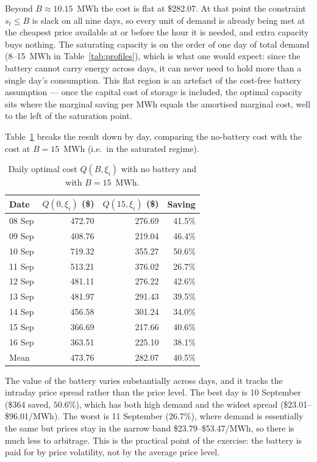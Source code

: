 Beyond $B \approx 10.15$~MWh the cost is flat at \$282.07. At that point the
constraint $s_t \le B$ is slack on all nine days, so every unit of demand is
already being met at the cheapest price available at or before the hour it is
needed, and extra capacity buys nothing. The saturating capacity is on the order of
one day of total demand (8--15~MWh in Table~\ref{tab:profiles}), which is what one
would expect: since the battery cannot carry energy across days, it can never need
to hold more than a single day's consumption. This flat region is an artefact of
the cost-free battery assumption --- once the capital cost of storage is included,
the optimal capacity sits where the marginal saving per MWh equals the amortised
marginal cost, well to the left of the saturation point.

Table~\ref{tab:days} breaks the result down by day, comparing the no-battery cost
with the cost at $B=15$~MWh (i.e.\ in the saturated regime).

\begin{table}[h]
  \centering
  \caption{Daily optimal cost $Q(B,\xi_i)$ with no battery and with $B=15$~MWh.}
  \label{tab:days}
  \begin{tabular}{l|rrr}
    \hline
    Date & $Q(0,\xi_i)$ (\$) & $Q(15,\xi_i)$ (\$) & Saving \\
    \hline
    08 Sep & 472.70 & 276.69 & 41.5\% \\
    09 Sep & 408.76 & 219.04 & 46.4\% \\
    10 Sep & 719.32 & 355.27 & 50.6\% \\
    11 Sep & 513.21 & 376.02 & 26.7\% \\
    12 Sep & 481.11 & 276.22 & 42.6\% \\
    13 Sep & 481.97 & 291.43 & 39.5\% \\
    14 Sep & 456.58 & 301.24 & 34.0\% \\
    15 Sep & 366.69 & 217.66 & 40.6\% \\
    16 Sep & 363.51 & 225.10 & 38.1\% \\
    \hline
    Mean   & 473.76 & 282.07 & 40.5\% \\
    \hline
  \end{tabular}
\end{table}

The value of the battery varies substantially across days, and it tracks the
intraday price spread rather than the price level. The best day is 10 September
(\$364 saved, $50.6\%$), which has both high demand and the widest spread
(\$23.01--\$96.01/MWh). The worst is 11 September ($26.7\%$), where demand is
essentially the same but prices stay in the narrow band \$23.79--\$53.47/MWh, so
there is much less to arbitrage. This is the practical point of the exercise: the
battery is paid for by price volatility, not by the average price level.

